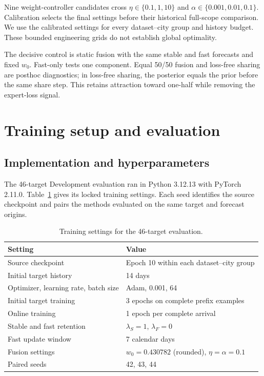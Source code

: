 Nine weight-controller candidates cross $\eta\in\{0.1,1,10\}$ and $\alpha\in\{0.001,0.01,0.1\}$. Calibration selects the final settings before their historical full-scope comparison. We use the calibrated settings for every dataset--city group and history budget. These bounded engineering grids do not establish global optimality.

The decisive control is static fusion with the same stable and fast forecasts and fixed $w_0$. Fast-only tests one component. Equal 50/50 fusion and loss-free sharing are posthoc diagnostics; in loss-free sharing, the posterior equals the prior before the same share step. This retains attraction toward one-half while removing the expert-loss signal.

\section{Training setup and evaluation}
\subsection{Implementation and hyperparameters}
The 46-target Development evaluation ran in Python 3.12.13 with PyTorch 2.11.0. Table~\ref{tab:ch4training} gives its locked training settings. Each seed identifies the source checkpoint and pairs the methods evaluated on the same target and forecast origins.

\begin{table}[htbp]\centering\small
\caption{Training settings for the 46-target evaluation.}\label{tab:ch4training}
\begin{tabular}{ll}\toprule
Setting & Value\\\midrule
Source checkpoint & Epoch 10 within each dataset--city group\\
Initial target history & 14 days\\
Optimizer, learning rate, batch size & Adam, 0.001, 64\\
Initial target training & 3 epochs on complete prefix examples\\
Online training & 1 epoch per complete arrival\\
Stable and fast retention & $\lambda_S=1$, $\lambda_F=0$\\
Fast update window & 7 calendar days\\
Fusion settings & $w_0=0.430782$ (rounded), $\eta=\alpha=0.1$\\
Paired seeds & 42, 43, 44\\\bottomrule
\end{tabular}\end{table}
